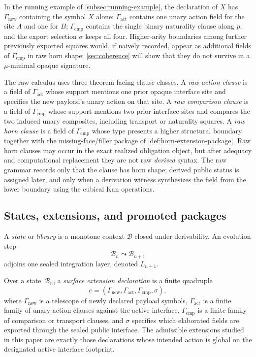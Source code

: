\documentclass{lmcs}
\newcommand{\B}{\mathcal{B}}
\begin{document}
In the running example of \autoref{subsec:running-example}, the declaration of $X$ has $\Gamma_{\mathrm{new}}$ containing the symbol $X$ alone; $\Gamma_{\mathrm{act}}$ contains one unary action field for the site $A$ and one for $B$; $\Gamma_{\mathrm{cmp}}$ contains the single binary naturality clause along $p$; and the export selection $\sigma$ keeps all four. Higher-arity boundaries among further previously exported squares would, if naively recorded, appear as additional fields of $\Gamma_{\mathrm{cmp}}$ in raw horn shape; \autoref{sec:coherence} will show that they do not survive in a $\mu$-minimal opaque signature.

\begin{defi}
\label{def:raw-structural-clauses}
The raw calculus uses three theorem-facing clause classes. A \emph{raw action
clause} is a field of $\Gamma_{\mathrm{act}}$ whose support mentions one prior
opaque interface site and specifies the new payload's unary action on that site.
A \emph{raw comparison clause} is a field of $\Gamma_{\mathrm{cmp}}$ whose
support mentions two prior interface sites and compares the two induced unary
composites, including transport or naturality squares. A \emph{raw horn clause}
is a field of $\Gamma_{\mathrm{cmp}}$ whose type presents a higher structural
boundary together with the missing-face/filler package of
\autoref{def:horn-extension-package}. Raw horn clauses may occur in the exact
realized obligation object, but after adequacy and computational replacement
they are not raw \emph{derived} syntax. The raw grammar records only that the
clause has horn shape; derived public status is assigned later, and only when a
derivation witness synthesizes the field from the lower boundary using the
cubical Kan operations.
\end{defi}

\subsection{States, extensions, and promoted packages}

\begin{defi}[State]
\label{def:state}
A \emph{state} or \emph{library} is a monotone context $\B$ closed under derivability. An evolution step
\[
  \B_n \leadsto \B_{n+1}
\]
adjoins one sealed integration layer, denoted $L_{n+1}$.
\end{defi}

\begin{defi}
\label{def:surface-extension}
Over a state~$\B_n$, a \emph{surface extension declaration} is a finite quadruple
\[
  e = (\Gamma_{\mathrm{new}}, \Gamma_{\mathrm{act}}, \Gamma_{\mathrm{cmp}}, \sigma),
\]
where $\Gamma_{\mathrm{new}}$ is a telescope of newly declared payload symbols, $\Gamma_{\mathrm{act}}$ is a finite family of unary action clauses against the active interface, $\Gamma_{\mathrm{cmp}}$ is a finite family of comparison or transport clauses, and $\sigma$ specifies which elaborated fields are exported through the sealed public interface. The admissible extensions studied in this paper are exactly those declarations whose intended action is global on the designated active interface footprint.
\end{defi}
\end{document}
